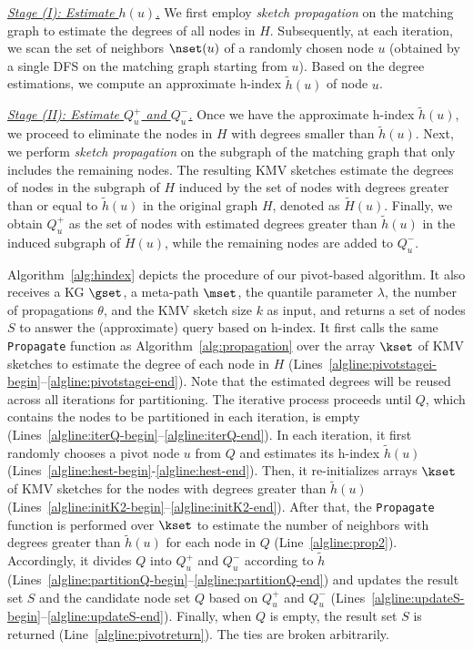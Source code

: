 \noindent\underline{\textit{Stage (I): Estimate $h(u)$.}}
We first employ \emph{sketch propagation} on the matching graph to estimate the degrees of all nodes in $H$.
Subsequently, at each iteration, we scan the set of neighbors $\nset(u)$ of a randomly chosen node $u$ (obtained by a single DFS on the matching graph starting from $u$).
Based on the degree estimations, we compute an approximate h-index $\widetilde{h}(u)$ of node $u$.

\noindent\underline{\textit{Stage (II): Estimate $Q^+_u$ and $Q^-_u$.}}
Once we have the approximate h-index $\widetilde{h}(u)$, we proceed to eliminate the nodes in $H$ with degrees smaller than $\widetilde{h}(u)$.
Next, we perform \emph{sketch propagation} on the subgraph of the matching graph that only includes the remaining nodes.
The resulting KMV sketches estimate the degrees of nodes in the subgraph of $H$ induced by the set of nodes with degrees greater than or equal to $\widetilde{h}(u)$ in the original graph $H$, denoted as $\widetilde{H}(u)$.
Finally, we obtain $Q^+_u$ as the set of nodes with estimated degrees greater than $\widetilde{h}(u)$ in the induced subgraph of $\widetilde{H}(u)$, while the remaining nodes are added to $Q^-_u$.

Algorithm~\ref{alg:hindex} depicts the procedure of our pivot-based algorithm.
It also receives a KG $\gset$, a meta-path $\mset$, the quantile parameter $\lambda$, the number of propagations $\theta$, and the KMV sketch size $k$ as input, and returns a set of nodes $S$ to answer the (approximate) \ced query based on h-index.
It first calls the same \texttt{Propagate} function as Algorithm~\ref{alg:propagation} over the array $\kset$ of KMV sketches to estimate the degree of each node in $H$ (Lines~\ref{algline:pivotstagei-begin}--\ref{algline:pivotstagei-end}).
Note that the estimated degrees will be reused across all iterations for partitioning.
The iterative process proceeds until $Q$, which contains the nodes to be partitioned in each iteration, is empty (Lines~\ref{algline:iterQ-begin}--\ref{algline:iterQ-end}).
In each iteration, it first randomly chooses a pivot node $u$ from $Q$ and estimates its h-index $\widetilde{h}(u)$ (Lines~\ref{algline:hest-begin}-\ref{algline:hest-end}).
Then, it re-initializes arrays $\kset$ of KMV sketches for the nodes with degrees greater than $\widetilde{h}(u)$ (Lines~\ref{algline:initK2-begin}--\ref{algline:initK2-end}).
After that, the \texttt{Propagate} function is performed over $\kset$ to estimate the number of neighbors with degrees greater than $\widetilde{h}(u)$ for each node in $Q$ (Line~\ref{algline:prop2}).
Accordingly, it divides $Q$ into $Q^+_u$ and $Q^-_u$ according to $\widetilde{h}$ (Lines~\ref{algline:partitionQ-begin}--\ref{algline:partitionQ-end}) and updates the result set $S$ and the candidate node set $Q$ based on $Q^+_u$ and $Q^-_u$ (Lines~\ref{algline:updateS-begin}--\ref{algline:updateS-end}).
Finally, when $Q$ is empty, the result set $S$ is returned (Line~\ref{algline:pivotreturn}). The ties are broken arbitrarily.


